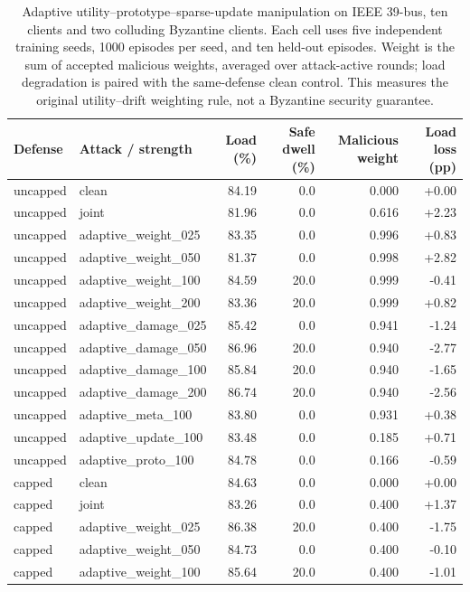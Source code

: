 \begin{table}[t]
\centering\small
\caption{Adaptive utility--prototype--sparse-update manipulation on IEEE 39-bus, ten clients and two colluding Byzantine clients. Each cell uses five independent training seeds, 1000 episodes per seed, and ten held-out episodes. Weight is the sum of accepted malicious weights, averaged over attack-active rounds; load degradation is paired with the same-defense clean control. This measures the original utility--drift weighting rule, not a Byzantine security guarantee.}
\label{tab:r3-adaptive-strength}
\begin{tabular}{llrrrr}
\hline
Defense & Attack / strength & Load (\%) & Safe dwell (\%) & Malicious weight & Load loss (pp)\\
\hline
uncapped & clean & 84.19 & 0.0 & 0.000 & +0.00\\
uncapped & joint & 81.96 & 0.0 & 0.616 & +2.23\\
uncapped & adaptive\_weight\_025 & 83.35 & 0.0 & 0.996 & +0.83\\
uncapped & adaptive\_weight\_050 & 81.37 & 0.0 & 0.998 & +2.82\\
uncapped & adaptive\_weight\_100 & 84.59 & 20.0 & 0.999 & -0.41\\
uncapped & adaptive\_weight\_200 & 83.36 & 20.0 & 0.999 & +0.82\\
uncapped & adaptive\_damage\_025 & 85.42 & 0.0 & 0.941 & -1.24\\
uncapped & adaptive\_damage\_050 & 86.96 & 20.0 & 0.940 & -2.77\\
uncapped & adaptive\_damage\_100 & 85.84 & 20.0 & 0.940 & -1.65\\
uncapped & adaptive\_damage\_200 & 86.74 & 20.0 & 0.940 & -2.56\\
uncapped & adaptive\_meta\_100 & 83.80 & 0.0 & 0.931 & +0.38\\
uncapped & adaptive\_update\_100 & 83.48 & 0.0 & 0.185 & +0.71\\
uncapped & adaptive\_proto\_100 & 84.78 & 0.0 & 0.166 & -0.59\\
\hline
capped & clean & 84.63 & 0.0 & 0.000 & +0.00\\
capped & joint & 83.26 & 0.0 & 0.400 & +1.37\\
capped & adaptive\_weight\_025 & 86.38 & 20.0 & 0.400 & -1.75\\
capped & adaptive\_weight\_050 & 84.73 & 0.0 & 0.400 & -0.10\\
capped & adaptive\_weight\_100 & 85.64 & 20.0 & 0.400 & -1.01\\

\end{tabular}
\end{table}
